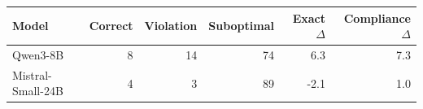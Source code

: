 \begin{tabular}{lrrrrr}
\toprule
Model & Correct & Violation & Suboptimal & Exact $\Delta$ & Compliance $\Delta$ \\
\midrule
Qwen3-8B & 8 & 14 & 74 & 6.3 & 7.3 \\
Mistral-Small-24B & 4 & 3 & 89 & -2.1 & 1.0 \\
\bottomrule
\end{tabular}
